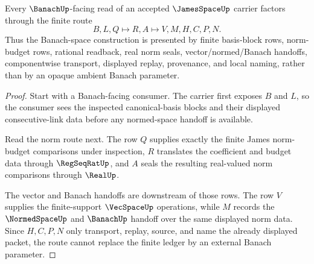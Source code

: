 \begin{theorem}
\label{thm:james-space-banach-route}
Every $\BanachUp$-facing read of an accepted $\JamesSpaceUp$ carrier factors through the finite route
$$
B,L,Q \longmapsto R,A \longmapsto V,M,H,C,P,N .
$$
Thus the Banach-space construction is presented by finite basis-block rows, norm-budget rows, rational readback, real norm seals, vector/normed/Banach handoffs, componentwise transport, displayed replay, provenance, and local naming, rather than by an opaque ambient Banach parameter.
\end{theorem}
\begin{proof}
Start with a Banach-facing consumer. The carrier first exposes $B$ and $L$, so the consumer sees the inspected canonical-basis blocks and their displayed consecutive-link data before any normed-space handoff is available.

Read the norm route next. The row $Q$ supplies exactly the finite James norm-budget comparisons under inspection, $R$ translates the coefficient and budget data through $\RegSeqRatUp$, and $A$ seals the resulting real-valued norm comparisons through $\RealUp$.

The vector and Banach handoffs are downstream of those rows. The row $V$ supplies the finite-support $\VecSpaceUp$ operations, while $M$ records the $\NormedSpaceUp$ and $\BanachUp$ handoff over the same displayed norm data. Since $H,C,P,N$ only transport, replay, source, and name the already displayed packet, the route cannot replace the finite ledger by an external Banach parameter.
\end{proof}




